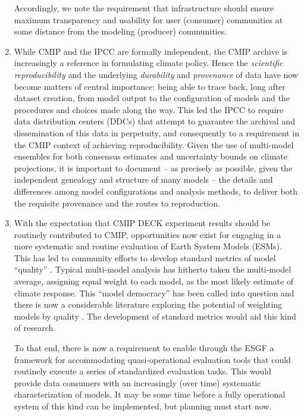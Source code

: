 \documentclass[gmd,manuscript]{copernicus}
\begin{document}
\begin{enumerate}
  Accordingly, we note the requirement that infrastructure should
  ensure maximum transparency and usability for user (consumer)
  communities at some distance from the modeling (producer)
  communities.
\item\label{repro} While CMIP and the IPCC are formally independent,
  the CMIP archive is increasingly a reference in formulating climate
  policy. Hence the \emph{scientific reproducibility}
  \citep{ref:collinstabak2014} and the underlying \emph{durability}
  and \emph{provenance} of data have now become matters of central
  importance: being able to trace
  back, long after dataset creation, from model output to the configuration of
  models and the procedures and choices made along the way. This led the
  IPCC to require data distribution centers (DDCs) that attempt to
  guarantee the archival and dissemination of this data in perpetuity,
  and consequently to a requirement in the CMIP context of
  achieving reproducibility. Given the use of multi-model ensembles
  for both consensus estimates and uncertainty bounds on climate
  projections, it is important to document -- as precisely as
  possible, given the independent genealogy and structure of many
  models -- the details and differences among model configurations and
  analysis methods, to deliver both the requisite provenance and the
  routes to reproduction.
\item\label{analysis} With the expectation that CMIP DECK experiment
  results should be routinely contributed to CMIP, opportunities now
  exist for engaging in a more systematic and routine evaluation of
  Earth System Models (ESMs). This has led to community efforts to
  develop standard metrics of model ``quality''
  \citep{ref:eyringetal2016,ref:gleckleretal2016}.
  Typical multi-model analysis has hitherto taken the multi-model
  average, assigning equal weight to each model, as the most likely
  estimate of climate response. This ``model democracy''
  \citep{ref:knutti2010} has been called into question and there is
  now a considerable literature exploring the potential of weighting
  models by quality \citep{ref:knuttietal2017}. The development of
  standard metrics would aid this kind of research.

  To that end, there is now a requirement to enable through the ESGF a
  framework for accommodating quasi-operational evaluation tools that
  could routinely execute a series of standardized evaluation tasks.
  This would provide data consumers with an increasingly (over time)
  systematic characterization of models. It may be some time before a
  fully operational system of this kind can be implemented, but
  planning must start now.


\end{enumerate}
\end{document}
